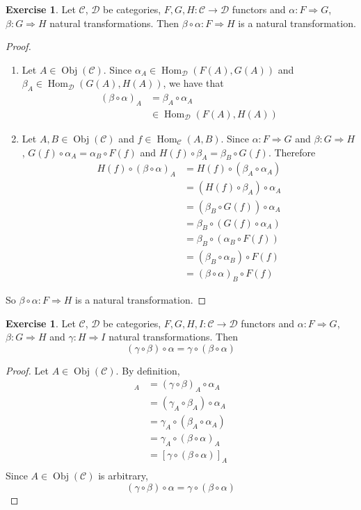 \documentclass[12pt]{amsart}
\theoremstyle{definition}
\newtheorem{ex}[definition]{Exercise}
\newcommand{\al}{\alpha}
\newcommand{\gam}{\gamma}
\newcommand{\be}{\beta}
\newcommand{\MC}{\mathcal{C}}
\newcommand{\MD}{\mathcal{D}}
\DeclareMathOperator{\Obj}{Obj}
\DeclareMathOperator{\Hom}{Hom}
\DeclareMathOperator*{\0}{\mbf{0}}
\DeclareMathOperator*{\1}{\mbf{1}}
\newcommand{\lex}[1]{\label{ex:#1}}
\begin{document}
	\begin{ex}  \lex{14003}
		Let $\MC$, $\MD$ be categories, $F, G, H:\MC \rightarrow \MD$ functors and $\al: F \Rightarrow G$, $\be : G \Rightarrow H$ natural transformations. Then $ \be \circ \al: F \Rightarrow H$ is a natural transformation.
	\end{ex}
	
	\begin{proof}\
		\begin{enumerate}
			\item Let $A \in \Obj(\MC)$. Since $\al_A \in \Hom_{\MD}(F(A), G(A))$ and $\be_A \in \Hom_{\MD}(G(A), H(A))$, we have that 
			\begin{align*}
				(\be \circ \al)_A 
				& = \be_A \circ \al_A \\
				& \in \Hom_{\MD}(F(A), H(A))
			\end{align*}
			\item Let $A,B \in \Obj(\MC)$ and $f \in \Hom_{\MC}(A,B)$. Since $\al:F \Rightarrow G$ and $\be: G \Rightarrow H$, $G(f) \circ \al_A = \al_B \circ F(f)$ and $H(f) \circ \be_A = \be_B \circ G(f)$. Therefore 
			\begin{align*}
				H(f) \circ (\be \circ \al)_A
				& = H(f) \circ (\be_A \circ \al_A) \\
				& = (H(f) \circ \be_A) \circ \al_A \\
				& = (\be_B \circ G(f)) \circ \al_A \\
				& = \be_B \circ (G(f)\circ \al_A) \\
				& = \be_B \circ (\al_B \circ F(f)) \\
				& = (\be_B \circ \al_B) \circ F(f) \\
				& = (\be \circ \al)_B \circ F(f)
			\end{align*}
		\end{enumerate}
		So $\be \circ \al: F \Rightarrow H$ is a natural transformation. 
	\end{proof}

	\begin{ex} \lex{14003.1}
		Let $\MC$, $\MD$ be categories, $F, G, H, I:\MC \rightarrow \MD$ functors and $\al: F \Rightarrow G$, $\be : G \Rightarrow H$ and $\gam: H \Rightarrow I$ natural transformations. Then $$(\gam \circ \be) \circ \al = \gam \circ (\be \circ \al)$$
	\end{ex}

	\begin{proof}
		Let $A \in \Obj(\MC)$. By definition,  
		\begin{align*}
			[(\gam \circ \be) \circ \al]_{A} 
			& = (\gam \circ \be)_A \circ \al_{A} \\
			& = (\gam_A \circ \be_A) \circ \al_A \\
			& = \gam_A \circ (\be_A \circ \al_A) \\
			& = \gam_A \circ (\be \circ \al)_A \\
			& = [\gam \circ (\be \circ \al)]_A \\
		\end{align*}
		Since $A \in \Obj(\MC)$ is arbitrary, 
		$$(\gam \circ \be) \circ \al = \gam \circ (\be \circ \al)$$
	\end{proof}
\end{document}
